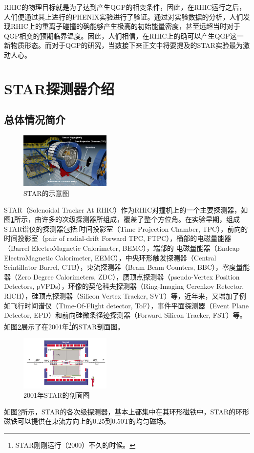 \documentclass[%
 reprint,
 amsmath,amssymb,
 aps,
]{revtex4-1}
\begin{document}
RHIC的物理目标就是为了达到产生QGP的相变条件，因此，在RHIC运行之后，人们便通过其上进行的PHENIX实验进行了验证。通过对实验数据的分析，人们发现RHIC上的重离子碰撞的确能够产生极高的初始能量密度，甚至远超当时对于QGP相变的预期临界温度。因此，人们相信，在RHIC上的确可以产生QGP这一新物质形态。而对于QGP的研究，当数接下来正文中将要提及的STAR实验最为激动人心。
\section{\label{sec:STAR}STAR探测器介绍}
\subsection{\label{sec:staroverview}总体情况简介}
\begin{figure}[htbp]
    \includegraphics[width=0.4\textwidth]{Plots/STAR.png}
    \caption{\label{fig:STAR}STAR的示意图}
\end{figure}
STAR（Solenoidal Tracker At RHIC）\cite{Adams:2005dq}\cite{Adams:2003kv}作为RHIC对撞机上的一个主要探测器，如图\ref{fig:STAR}所示，由许多的次级探测器所组成，覆盖了整个方位角。在实验早期，组成STAR谱仪的探测器包括:时间投影室（Time Projection Chamber, TPC），前向的时间投影室（pair of radial-drift Forward TPC, FTPC），桶部的电磁量能器（Barrel ElectroMagnetic Calorimeter, BEMC），端部的 电磁量能器（Endcap ElectroMagnetic Calorimeter, EEMC），中央环形触发探测器（Central Scintillator Barrel, CTB），束流探测器（Beam Beam Counters, BBC），零度量能器（Zero Degree Calorimeters, ZDC），赝顶点探测器（pseudo-Vertex Position Detectors, pVPDs），环像的契伦科夫探测器（Ring-Imaging Cerenkov Retector, RICH），硅顶点探测器（Silicon Vertex Tracker, SVT）等，近年来，又增加了例如飞行时间谱仪（Time-Of-Flight detector, ToF），事件平面探测器（Event Plane Detector, EPD）和前向硅微条径迹探测器（Forward Silicon Tracker, FST）等。如图\ref{fig:STARXsec}展示了在2001年\footnote{STAR刚刚运行（2000）不久的时候。}的STAR剖面图。
\begin{figure}[htbp]
    \includegraphics[width = 0.4\textwidth]{Plots/STARXsec.png}
    \caption{\label{fig:STARXsec}2001年STAR的剖面图}
\end{figure}
如图\ref{fig:STARXsec}所示，STAR的各次级探测器，基本上都集中在其环形磁铁中，STAR的环形磁铁可以提供在束流方向上的0.25到0.50T的均匀磁场。
\end{document}

